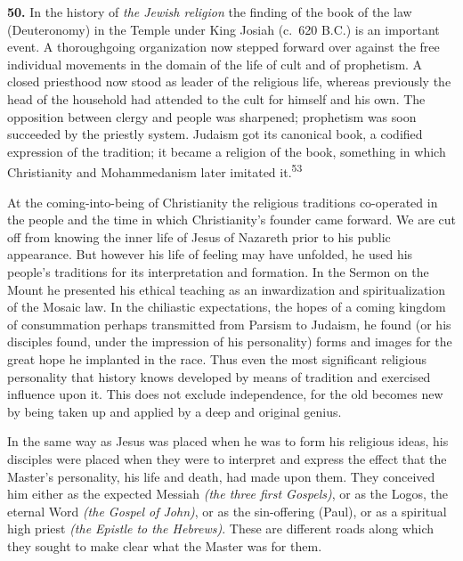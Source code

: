\documentclass[12pt,a4paper]{book}
\newcommand{\opage}[1]{\marginnote{\footnotesize\textit{[#1]}}}
\begin{document}
\medskip

\noindent
\opage{112}\textbf{50.} In the history of \emph{the Jewish religion} the finding of the book of the
law (Deuteronomy) in the Temple under King Josiah (c.~620 B.C.) is an important event. A
thoroughgoing organization now stepped forward over against the free individual movements in the
domain of the life of cult and of prophetism. A closed priesthood now stood as leader of the
religious life, whereas previously the head of the household had attended to the cult for himself
and his own. The opposition between clergy and people was sharpened; prophetism was soon
succeeded by the priestly system. Judaism got its canonical book, a codified expression of the
tradition; it became a religion of the book, something in which Christianity and Mohammedanism
later imitated it.\textsuperscript{53}

At the coming-into-being of Christianity the religious traditions co-operated in the people and
the time in which Christianity's founder came forward. We are cut off from knowing the inner life
of Jesus of Nazareth prior to his public appearance. But however his life of feeling may have
unfolded, he used his people's traditions for its interpretation and formation. In the Sermon on
the Mount he presented his ethical teaching as an inwardization and spiritualization of the Mosaic
law. In the chiliastic expectations, the hopes of a coming kingdom of consummation perhaps
transmitted from Parsism to Judaism, he found (or his disciples found, under the impression of his
personality) forms and images for the great hope he implanted in the race. Thus even the most
significant religious personality that history knows developed by means of tradition and exercised
influence upon it. This does not exclude independence, for the old becomes new by being taken up
and applied by a deep and original genius.

In the same way as Jesus was placed when he was to form his religious ideas, his disciples were
placed when they were to interpret and express the effect that the Master's personality, his life
and death, had made upon them. They conceived him either as the expected Messiah \emph{(the three
first Gospels)}, or as the Logos, the eternal Word \emph{(the Gospel of John)}, or as the
sin-offering (Paul), or as a spiritual high priest \emph{(the Epistle to the Hebrews)}. These are
different roads along which they sought to make clear what the Master was for them.

\medskip
\end{document}
